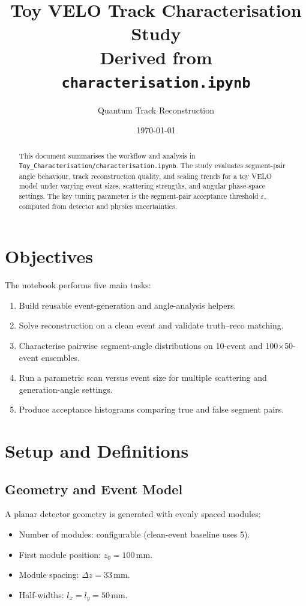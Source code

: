 \documentclass[11pt,a4paper]{article}
\title{Toy VELO Track Characterisation Study\\\large Derived from \texttt{characterisation.ipynb}}
\author{Quantum Track Reconstruction}
\date{\today}
\begin{document}
\maketitle

\begin{abstract}
This document summarises the workflow and analysis in
\texttt{Toy\_Characterisation/characterisation.ipynb}. The study evaluates
segment-pair angle behaviour, track reconstruction quality, and scaling trends
for a toy VELO model under varying event sizes, scattering strengths, and
angular phase-space settings. The key tuning parameter is the segment-pair
acceptance threshold $\varepsilon$, computed from detector and physics
uncertainties.
\end{abstract}

\section{Objectives}
The notebook performs five main tasks:
\begin{enumerate}[leftmargin=1.5em]
  \item Build reusable event-generation and angle-analysis helpers.
  \item Solve reconstruction on a clean event and validate truth--reco matching.
  \item Characterise pairwise segment-angle distributions on 10-event and
  100$\times$50-event ensembles.
  \item Run a parametric scan versus event size for multiple scattering and
  generation-angle settings.
  \item Produce acceptance histograms comparing true and false segment pairs.
\end{enumerate}

\section{Setup and Definitions}
\subsection{Geometry and Event Model}
A planar detector geometry is generated with evenly spaced modules:
\begin{itemize}[leftmargin=1.5em]
  \item Number of modules: configurable (clean-event baseline uses 5).
  \item First module position: $z_{0}=100\,\mathrm{mm}$.
  \item Module spacing: $\Delta z = 33\,\mathrm{mm}$.
  \item Half-widths: $l_x=l_y=50\,\mathrm{mm}$.
\end{itemize}
\end{document}

